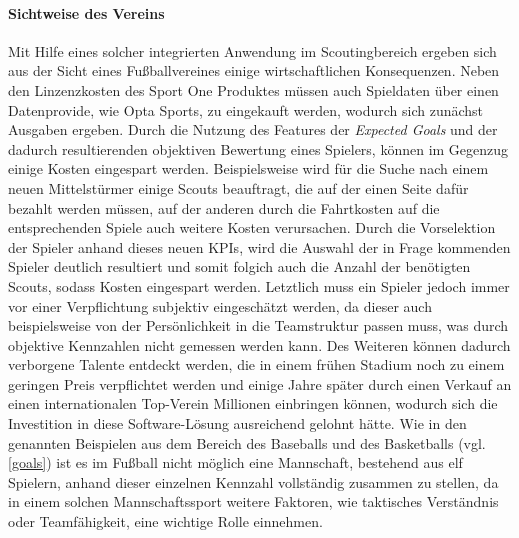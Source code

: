 \paragraph{Sichtweise des Vereins}
Mit Hilfe eines solcher integrierten Anwendung im Scoutingbereich ergeben sich aus der Sicht eines Fußballvereines einige wirtschaftlichen Konsequenzen. Neben den Linzenzkosten des Sport One Produktes müssen auch Spieldaten über einen Datenprovide, wie Opta Sports, zu eingekauft werden, wodurch sich zunächst Ausgaben ergeben. Durch die Nutzung des Features der \textit{Expected Goals} und der dadurch resultierenden objektiven Bewertung eines Spielers, können im Gegenzug einige Kosten eingespart werden. Beispielsweise wird für die Suche nach einem neuen Mittelstürmer einige Scouts beauftragt, die auf der einen Seite dafür bezahlt werden müssen, auf der anderen durch die Fahrtkosten auf die entsprechenden Spiele auch weitere Kosten verursachen. Durch die Vorselektion der Spieler anhand dieses neuen KPIs, wird die Auswahl der in Frage kommenden Spieler deutlich resultiert und somit folgich auch die Anzahl der benötigten Scouts, sodass Kosten eingespart werden. Letztlich muss ein Spieler jedoch immer vor einer Verpflichtung subjektiv eingeschätzt werden, da dieser auch beispielsweise von der Persönlichkeit in die Teamstruktur passen muss, was durch objektive Kennzahlen nicht gemessen werden kann. Des Weiteren können dadurch verborgene Talente entdeckt werden, die in einem frühen Stadium noch zu einem geringen Preis verpflichtet werden und einige Jahre später durch einen Verkauf an einen internationalen Top-Verein Millionen einbringen können, wodurch sich die Investition in diese Software-Lösung ausreichend gelohnt hätte. Wie in den genannten Beispielen aus dem Bereich des Baseballs und des Basketballs (vgl. \vref{goals}) ist es im Fußball nicht möglich eine Mannschaft, bestehend aus elf Spielern, anhand dieser einzelnen Kennzahl vollständig zusammen zu stellen, da in einem solchen Mannschaftssport weitere Faktoren, wie taktisches Verständnis oder Teamfähigkeit, eine wichtige Rolle einnehmen. 